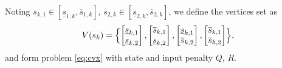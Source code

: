 \documentclass[letterpaper, 10 pt, conference]{ieeeconf}
\begin{document}
Noting $s_{k, 1} \in [\underline{s}_{1, k}, \overline{s}_{1, k}]$, $s_{2, k} \in [\underline{s}_{2, k}, \overline{s}_{2, k}]$, we define the vertices set as
\[V(s_k) = \Bigl\{ \begin{bmatrix} \underline{s}_{k, 1}\\ \underline{s}_{k, 2} \end{bmatrix}, \begin{bmatrix} \overline{s}_{k, 1}\\ \underline{s}_{k, 2} \end{bmatrix}, \begin{bmatrix} \underline{s}_{k, 1}\\ \overline{s}_{k, 2} \end{bmatrix}, \begin{bmatrix} \overline{s}_{k, 1}\\ \overline{s}_{k, 2} \end{bmatrix}\Bigr\}, 
\] 
and form problem \eqref{eq:cvx} with state and input penalty $Q$, $R$.
\end{document}
